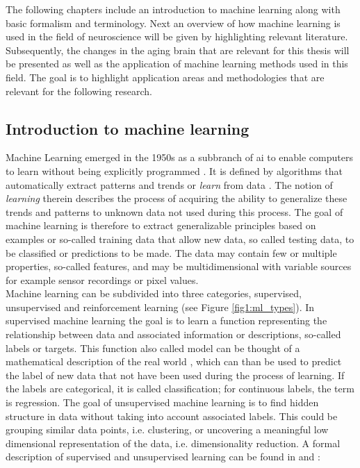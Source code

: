 The following chapters include an introduction to machine learning along with basic formalism and terminology. Next an overview of how machine learning is used in the field of neuroscience will be given by highlighting relevant literature. Subsequently, the changes in the aging brain that are relevant for this thesis will be presented as well as the application of machine learning methods used in this field. The goal is to highlight application areas and methodologies that are relevant for the following research. 

\subsection{Introduction to machine learning}
\label{subsec:ML}
Machine Learning emerged in the 1950s as a subbranch of \gls{ai} to enable computers to learn without being explicitly programmed \cite{Samual1959}. It is defined by algorithms that automatically extract patterns and trends or \textit{learn} from data \cite{Hastie2009}. The notion of \textit{learning} therein describes the process of acquiring the ability to generalize these trends and patterns to unknown data not used during this process. The goal of machine learning is therefore to extract generalizable principles based on examples or so-called training data that allow new data, so called testing data, to be classified or predictions to be made. The data may contain few or multiple properties, so-called features, and may be multidimensional with variable sources for example sensor recordings or pixel values.\\ 
Machine learning can be subdivided into three categories, supervised, unsupervised and reinforcement learning (see Figure \ref{fig1:ml_types}). In supervised machine learning the goal is to learn a function representing the relationship between data and associated information or descriptions, so-called labels or targets. This function also called model can be thought of a mathematical description of the real world \cite{Brunton2019}, which can than be used to predict the label of new data that not have been used during the process of learning. If the labels are categorical, it is called classification; for continuous labels, the term is regression. The goal of unsupervised machine learning is to find hidden structure in data without taking into account associated labels. This could be grouping similar data points, i.e. clustering, or uncovering a meaningful low dimensional representation of the data, i.e. dimensionality reduction. 
A formal description of supervised and unsupervised learning can be found in \cite{Brunton_kutz_2019} and \cite{Murphy2012}:\\
